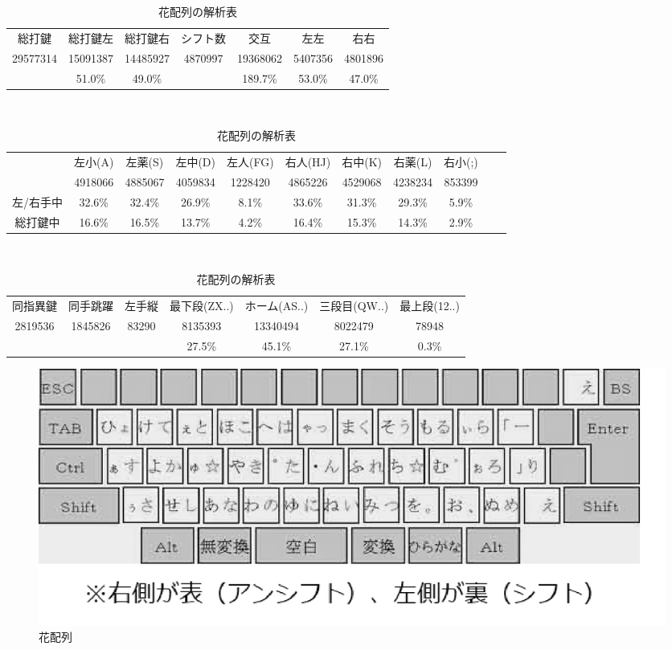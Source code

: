 \begin{table}[htbp]
 \caption{花配列の解析表}
 \begin{center}
 \begin{tabular}{cccc|ccc}
 \hline
総打鍵 & 総打鍵左 & 総打鍵右 & シフト数 & 交互 & 左左 & 右右 \\
29577314 & 15091387 & 14485927 & 4870997 & 19368062 & 5407356 & 4801896\\
 & 51.0\% & 49.0\% &  & 189.7\% & 53.0\% & 47.0\%\\
 \hline
 \end{tabular}

 　\vspace{1zw}　

 \begin{tabular}{ccccccccccc}
 \hline
& 左小(A) & 左薬(S) & 左中(D) & 左人(FG) & 右人(HJ) & 右中(K) & 右薬(L) & 右小(;)\\
& 4918066 & 4885067 & 4059834 & 1228420 & 4865226 & 4529068 & 4238234 & 853399\\
左/右手中 & 32.6\% & 32.4\% & 26.9\% & 8.1\% & 33.6\% & 31.3\% & 29.3\% & 5.9\%\\
総打鍵中 & 16.6\% & 16.5\% & 13.7\% & 4.2\% & 16.4\% & 15.3\% & 14.3\% & 2.9\%\\
\hline
 \end{tabular}

 　\vspace{1zw}　

 \begin{tabular}{ccc|cccc}
 \hline
 同指異鍵 & 同手跳躍 & 左手縦 & 最下段(ZX..) & ホーム(AS..) & 三段目(QW..) & 最上段(12..)\\
2819536 & 1845826 & 83290 & 8135393 & 13340494 & 8022479 & 78948\\
 &  &  & 27.5\% & 45.1\% & 27.1\% & 0.3\%\\
\hline
 \end{tabular}
 \end{center}
 \label{tbl:hana}
\end{table}

\begin{figure}[htbp]
 \begin{center}
  \includegraphics[width=0.8\hsize]{hana.eps}
 \end{center}
 \caption{花配列}
 \label{fig:hana}
\end{figure}



